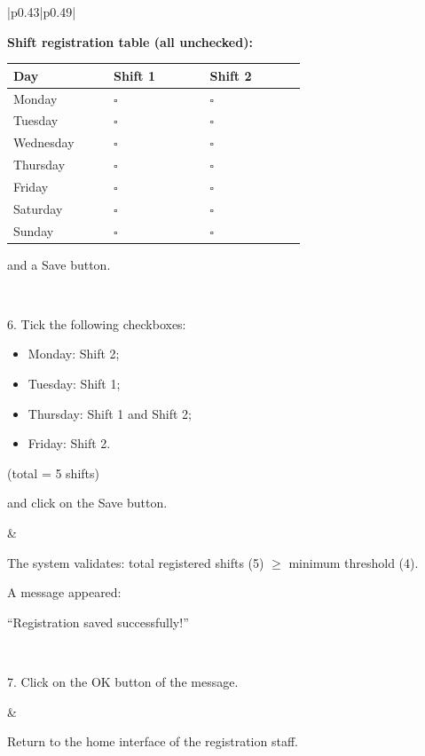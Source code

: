 \begin{longtable}{|p{0.43\textwidth}|p{0.49\textwidth}|}
\begin{minipage}[t]{\linewidth}
\textbf{Shift registration table (all unchecked):}

{\scriptsize
\setlength{\tabcolsep}{2pt}
\begin{tabular}{|p{0.25\linewidth}|p{0.24\linewidth}|p{0.24\linewidth}|}
\hline
\textbf{Day} & \textbf{Shift 1} & \textbf{Shift 2} \\
\hline
Monday & $\square$ & $\square$ \\
\hline
Tuesday & $\square$ & $\square$ \\
\hline
Wednesday & $\square$ & $\square$ \\
\hline
Thursday & $\square$ & $\square$ \\
\hline
Friday & $\square$ & $\square$ \\
\hline
Saturday & $\square$ & $\square$ \\
\hline
Sunday & $\square$ & $\square$ \\
\hline
\end{tabular}
}

and a Save button.
\par\vspace*{0.35em}
\end{minipage} \\
\hline
\begin{minipage}[t]{\linewidth}
6. Tick the following checkboxes:
\begin{itemize}
    \item Monday: Shift 2;
    \item Tuesday: Shift 1;
    \item Thursday: Shift 1 and Shift 2;
    \item Friday: Shift 2.
\end{itemize}
(total = 5 shifts)

and click on the Save button.
\par\vspace*{0.35em}
\end{minipage}
&
\begin{minipage}[t]{\linewidth}
The system validates: total registered shifts (5) $\geq$ minimum threshold (4).

A message appeared:

``Registration saved successfully!''
\par\vspace*{0.35em}
\end{minipage} \\
\hline
\begin{minipage}[t]{\linewidth}
7. Click on the OK button of the message.
\par\vspace*{0.35em}
\end{minipage}
&
\begin{minipage}[t]{\linewidth}
Return to the home interface of the registration staff.
\par\vspace*{0.35em}
\end{minipage} \\
\hline
\caption{Standard black-box test case scenario}\label{tab:testing-scenario-standard}
\end{longtable}

